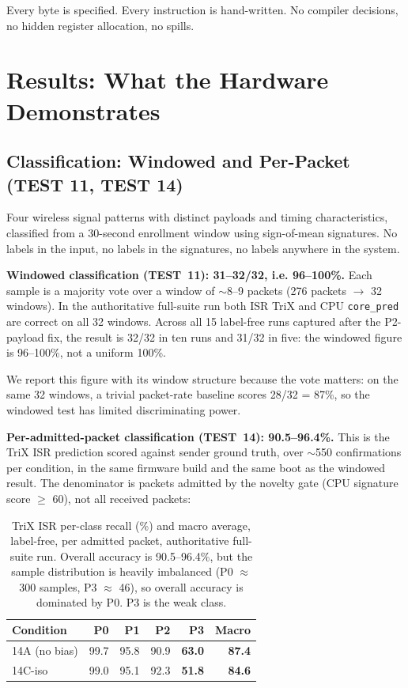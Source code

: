 \documentclass[11pt,letterpaper]{article}
\begin{document}
Every byte is specified. Every instruction is hand-written. No compiler decisions, no hidden register allocation, no spills.

\section{Results: What the Hardware Demonstrates}

\subsection{Classification: Windowed and Per-Packet (TEST 11, TEST 14)}
\label{sec:classification}

Four wireless signal patterns with distinct payloads and timing characteristics, classified from a 30-second enrollment window using sign-of-mean signatures. No labels in the input, no labels in the signatures, no labels anywhere in the system.

\textbf{Windowed classification (TEST~11): 31--32/32, i.e. 96--100\%.} Each sample is a majority vote over a window of $\sim$8--9 packets (276 packets $\to$ 32 windows). In the authoritative full-suite run both ISR TriX and CPU \texttt{core\_pred} are correct on all 32 windows. Across all 15 label-free runs captured after the P2-payload fix, the result is 32/32 in ten runs and 31/32 in five: the windowed figure is 96--100\%, not a uniform 100\%.

We report this figure with its window structure because the vote matters: on the same 32 windows, a trivial packet-rate baseline scores 28/32 = 87\%, so the windowed test has limited discriminating power.

\textbf{Per-admitted-packet classification (TEST~14): 90.5--96.4\%.} This is the TriX ISR prediction scored against sender ground truth, over $\sim$550 confirmations per condition, in the same firmware build and the same boot as the windowed result. The denominator is packets admitted by the novelty gate (CPU signature score $\ge$ 60), not all received packets:

\begin{table}[h]
\centering
\begin{tabular}{l rrrr r}
\toprule
Condition & P0 & P1 & P2 & P3 & Macro \\
\midrule
14A (no bias)  & 99.7 & 95.8 & 90.9 & \textbf{63.0} & \textbf{87.4} \\
14C-iso        & 99.0 & 95.1 & 92.3 & \textbf{51.8} & \textbf{84.6} \\
\bottomrule
\end{tabular}
\caption{TriX ISR per-class recall (\%) and macro average, label-free, per admitted packet, authoritative full-suite run. Overall accuracy is 90.5--96.4\%, but the sample distribution is heavily imbalanced (P0 $\approx$ 300 samples, P3 $\approx$ 46), so overall accuracy is dominated by P0. P3 is the weak class.}
\label{tab:per-packet}
\end{table}
\end{document}
